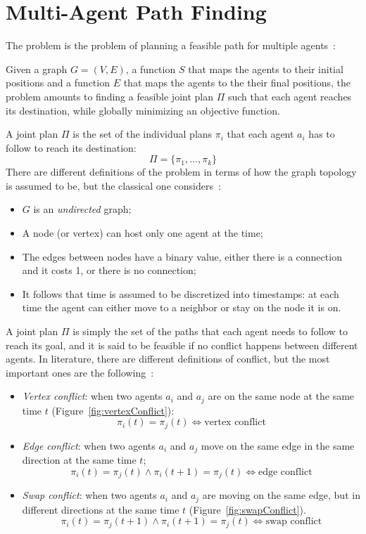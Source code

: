 \section{Multi-Agent Path Finding}
\label{sec:MAPF}
The  problem is the problem of planning a feasible path for multiple
agents~\cite{MAPF_definitions}:
\begin{definition}
  Given a graph $G=(V,E)$, a function $S$ that maps the agents to their initial
  positions and a function $E$ that maps the agents to the their final
  positions, the problem amounts to finding a feasible joint plan $\Pi$ such
  that each agent reaches its destination, while globally minimizing an
  objective function.
\end{definition}
A joint plan $\Pi$ is the set of the individual plans $\pi_i$ that each agent
$a_i$ has to follow to reach its destination: 
\[\Pi=\{\pi_1, \hdots, \pi_k\}\]
There are different definitions of the problem in terms of how the graph 
topology is assumed to be, but the classical one
considers~\cite{MAPF_definitions}:
\begin{itemize}
  \item $G$ is an \textit{undirected} graph;
  \item A node (or vertex) can host only one agent at the time;
  \item The edges between nodes have a binary value, either there is a
    connection and it costs 1, or there is no connection;
  \item It follows that time is assumed to be discretized into timestamps: at
    each time the agent can either move to a neighbor or stay on the node it is
    on. 
\end{itemize}
A joint plan $\Pi$ is simply the set of the paths that each agent needs to
follow to reach its goal, and it is said to be feasible if no conflict 
happens between different agents. In literature, there are different 
definitions of conflict, but the most important ones are the 
following~\cite{MAPF_overview}: 
\begin{itemize}
  \item \textit{Vertex conflict}: when two agents $a_i$ and $a_j$ are on the 
    same node at the same time $t$ (Figure~\ref{fig:vertexConflict}):
    \[\pi_i(t) = \pi_j(t) \iff \text{vertex conflict}\]
  \item \textit{Edge conflict}: when two agents $a_i$ and $a_j$ move on the 
    same edge in the same direction at the same time $t$;
    \[\pi_i(t) = \pi_j(t) \wedge \pi_i(t+1) = \pi_j(t) \iff \text{edge 
      conflict}\]
  \item \textit{Swap conflict}: when two agents $a_i$ and $a_j$ are moving on 
    the same edge, but in different directions at the same time $t$
    (Figure~\ref{fig:swapConflict}). 
    \[\pi_i(t) = \pi_j(t+1) \wedge \pi_i(t+1) = \pi_j(t) \iff \text{swap 
      conflict}\]
\end{itemize}
